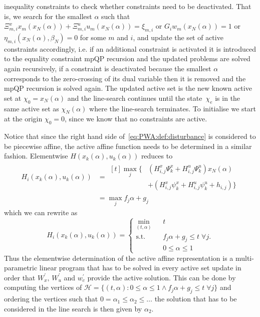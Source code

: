 \documentclass{ifacconf}
\begin{document}
inequality constraints to check whether constraints need to be deactivated. That is, we search for the
smallest $\alpha$ such that $\Xi_{m,i}^x x_m(x_N(\alpha))+\Xi_{m,i}^u u_m(x_N(\alpha))=\xi_{m,i}$ or
$G_iw_m(x_N(\alpha))=1$ or $\eta_{m,i}(x_N(\alpha),\beta_N)=0$ for some $m$ and $i$, and update the set of active
constraints accordingly, i.e. if an additional constraint is activated it is introduced to the equality
constraint mpQP recursion and the updated problems are solved again recursively, if a constraint is
deactivated because the smallest $\alpha$ corresponds to the zero-crossing of its dual variable then it is
removed and the
mpQP recursion is solved again. The updated active set is the new known active set at $\chi_0 = x_N(\alpha)$
and the line-search continues until the state~$\chi_e$ is in the same active set as $\chi_N(\alpha)$ where the
line-search terminates.  To initialise we start at the origin $\chi_0=0$, since we know that no constraints
are active.

Notice that since the right hand side of~\eqref{eq:PWA:def:disturbance} is considered to be piecewise affine, the active 
affine function needs to be determined in a similar fashion. Elementwise $H(x_k(\alpha),u_k(\alpha))$ reduces to 
\[
\begin{split}
	H_i(x_k(\alpha),u_k(\alpha)) &= \begin{aligned}[t] \max_j\{ & \left(H^x_{i,j} \Psi^x_k
          +H^u_{i,j}\Psi^u_k\right)x_N(\alpha)\\
        & + \left(H^x_{i,j} \psi^x_k +H^u_{i,j}\psi^u_k + h_{i,j}\right) \}
        \end{aligned}\\
	&=\max_j f_j\alpha + g_j
	\end{split}
\]
which we can rewrite as
\begin{equation}\label{eq:definition:as:mpLP}
	H_i(x_k(\alpha),u_k(\alpha)) = \left\{\begin{array}{rcl} \min_{(t,\alpha)}& &t\\
	\text{s.t.}& &f_j\alpha+g_j \leq t\; \forall j.\\
	& &0\leq\alpha\leq1
	\end{array}\right.
\end{equation}
Thus the elementwise determination of the active affine representation is a multi-parametric linear program
\citep[see e.g.][]{Gal:1995} that has to be solved in every active set update in order that $W_x^\prime,\,W_u^\prime$
and $w^\prime_c$ provide the active solution. This can be done by computing the vertices of
$\mathcal H = \{(t,\alpha):0\leq\alpha\leq1\wedge f_j\alpha+g_j\leq t\;\forall j\}$ and ordering the vertices
such that $0=\alpha_1\leq\alpha_2\leq\dots$ the solution that has to be considered in the line search is then given
by $\alpha_2$.
\end{document}
